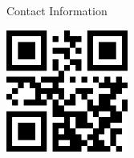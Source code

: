 \documentclass[final]{beamer}
\newlength{\onecolwid}
\begin{document}
\begin{frame}[t]
\begin{columns}[t]
\begin{column}{\onecolwid}
\begin{alertblock}{\faSendO{} Contact Information}
\end{alertblock}


\begin{minipage}[t]{0.25\linewidth}
\href{http://sirepo.com}{\includegraphics[height=4.0cm]{images/qr_sirepo.png}}
\end{minipage}


\end{column} %

\end{columns} %

\end{frame} %
\end{document}
